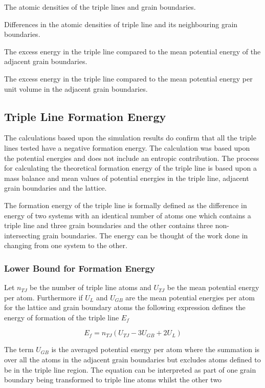 \documentclass[12pt,a4paper]{book}
\begin{document}
The atomic densities of the triple lines and grain boundaries.

Differences in the atomic densities of triple line and its neighbouring grain boundaries.

The excess energy in the triple line compared to the mean potential energy of the adjacent grain boundaries.

The excess energy in the triple line compared to the mean potential energy per unit volume in the adjacent grain boundaries. 



\subsection{Triple Line Formation Energy}

The calculations based upon the simulation results do confirm that all the triple lines tested have a negative formation energy. The calculation was based upon the potential energies and does not include an entropic contribution. The process for calculating the theoretical formation energy of the triple line is based upon a mass balance and mean values of potential energies in the triple line, adjacent grain boundaries and the lattice.

The formation energy of the triple line is formally defined as the difference in energy of two systems with an identical number of atoms one which contains a triple line and three grain boundaries and the other contains three non-intersecting grain boundaries. The energy can be thought of the work done in changing from one system to the other.

\subsubsection{Lower Bound for Formation Energy}

Let $n_{TJ}$ be the number of triple line atoms and $U_{TJ}$ be the mean potential energy per atom. Furthermore if $U_{L}$ and $U_{GB}$ are the mean potential energies per atom for the lattice and grain boundary atoms the following expression defines the energy of formation of the triple line $E_{f}$

\[ E_{f} = n_{TJ}\left(U_{TJ} -3U_{GB} + 2U_{L} \right) \]

The term $U_{GB}$ is the averaged potential energy per atom where the summation is over all the atoms in the adjacent grain boundaries but excludes atoms defined to be in the triple line region. The equation can be interpreted as part of one grain boundary being transformed to triple line atoms whilst the other two     
\end{document}
